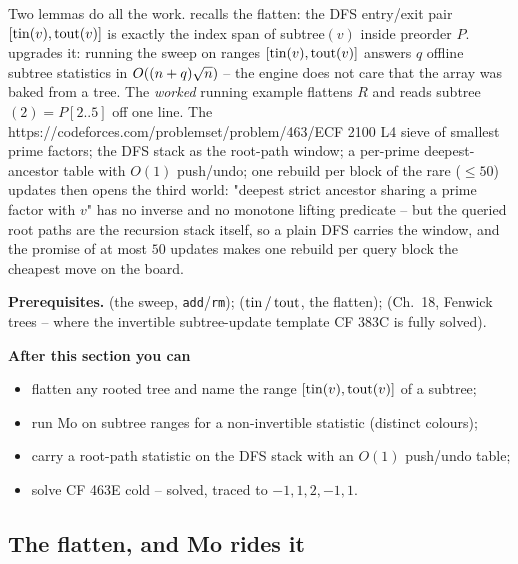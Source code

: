 \begin{topicintro}
Two lemmas do all the work.   recalls the flatten: the DFS
entry/exit pair \([\operatorname{tin}(v),\operatorname{tout}(v)]\) is exactly the index span of
subtree\((v)\) inside preorder \(P\).   upgrades it:
running the  sweep on ranges \([\operatorname{tin}(v),\operatorname{tout}(v)]\) answers
\(q\) offline subtree statistics in \(O((n+q)\sqrt n)\) -- the engine does
not care that the array was baked from a tree.  The \emph{worked} running
example flattens \(R\) and reads subtree\((2)=P[2..5]\) off one line.  The
  {https://codeforces.com/problemset/problem/463/E}{CF 2100 L4}
  {sieve of smallest prime factors; the DFS stack as the root-path window; a per-prime deepest-ancestor table with \(O(1)\) push/undo; one rebuild per block of the rare (\(\le 50\)) updates}
then opens the third world: "deepest strict ancestor sharing a prime factor
with \(v\)" has no inverse and no monotone lifting predicate -- but the queried
root paths are the recursion stack itself, so a plain DFS carries the window,
and the promise of at most \(50\) updates makes one rebuild per query block the
cheapest move on the board.

\textbf{Prerequisites.}  (the sweep, \texttt{add}/\texttt{rm});
 (\(\operatorname{tin}/\operatorname{tout}\), the flatten);  (Ch.~18, Fenwick trees --
where the invertible subtree-update template CF 383C is fully solved).

\textbf{After this section you can}
\begin{itemize}[nosep]
  \item flatten any rooted tree and name the range \([\operatorname{tin}(v),\operatorname{tout}(v)]\) of a subtree; \hfill{}
  \item run Mo on subtree ranges for a non-invertible statistic (distinct colours); \hfill{}
  \item carry a root-path statistic on the DFS stack with an \(O(1)\) push/undo table; \hfill{}
  \item solve CF 463E cold -- solved, traced to \(-1,1,2,-1,1\). \hfill{}
\end{itemize}
\end{topicintro}

\subsection{The flatten, and Mo rides it}

